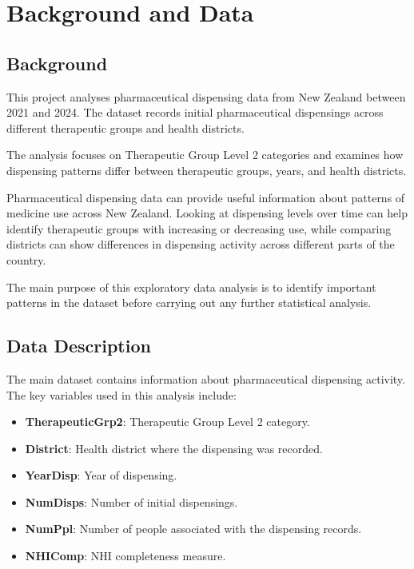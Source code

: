 \documentclass[11pt,a4paper]{report}
\begin{document}
\chapter{Background and Data}

\section{Background}

This project analyses pharmaceutical dispensing data from New Zealand between 2021 and 2024. The dataset records initial pharmaceutical dispensings across different therapeutic groups and health districts.

The analysis focuses on Therapeutic Group Level 2 categories and examines how dispensing patterns differ between therapeutic groups, years, and health districts.

Pharmaceutical dispensing data can provide useful information about patterns of medicine use across New Zealand. Looking at dispensing levels over time can help identify therapeutic groups with increasing or decreasing use, while comparing districts can show differences in dispensing activity across different parts of the country.

The main purpose of this exploratory data analysis is to identify important patterns in the dataset before carrying out any further statistical analysis.

\section{Data Description}

The main dataset contains information about pharmaceutical dispensing activity. The key variables used in this analysis include:

\begin{itemize}
    \item \textbf{TherapeuticGrp2}: Therapeutic Group Level 2 category.
    \item \textbf{District}: Health district where the dispensing was recorded.
    \item \textbf{YearDisp}: Year of dispensing.
    \item \textbf{NumDisps}: Number of initial dispensings.
    \item \textbf{NumPpl}: Number of people associated with the dispensing records.
    \item \textbf{NHIComp}: NHI completeness measure.
\end{itemize}
\end{document}
